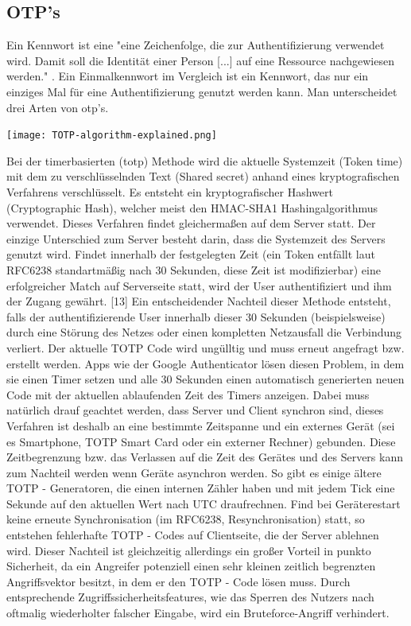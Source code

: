 \subsection{OTP's}
Ein Kennwort ist eine "eine Zeichenfolge, die zur Authentifizierung verwendet wird. Damit soll die Identität einer Person [...] auf eine Ressource nachgewiesen werden." \cite{A4}. Ein Einmalkennwort im Vergleich ist ein Kennwort, das nur ein einziges Mal für eine Authentifizierung genutzt werden kann. Man unterscheidet drei Arten von \ac{otp}'s.

\texttt{[image: TOTP-algorithm-explained.png]}

Bei der timerbasierten (\ac{totp}) Methode wird die aktuelle Systemzeit (Token time) mit dem zu verschlüsselnden Text (Shared secret) anhand eines kryptografischen Verfahrens verschlüsselt. Es entsteht ein kryptografischer Hashwert (Cryptographic Hash), welcher meist den HMAC-SHA1 Hashingalgorithmus verwendet. Dieses Verfahren findet gleichermaßen auf dem Server statt. Der einzige Unterschied zum Server besteht darin, dass die Systemzeit des Servers genutzt wird. Findet innerhalb der festgelegten Zeit (ein Token entfällt laut RFC6238 standartmäßig nach 30 Sekunden, diese Zeit ist modifizierbar) eine erfolgreicher Match auf Serverseite statt, wird der User authentifiziert und ihm der Zugang gewährt. [13] Ein entscheidender Nachteil dieser Methode entsteht, falls der authentifizierende User innerhalb dieser 30 Sekunden (beispielsweise) durch eine Störung des Netzes oder einen kompletten Netzausfall die Verbindung verliert. Der aktuelle TOTP Code wird ungülltig und muss erneut angefragt bzw. erstellt werden. Apps wie der Google Authenticator lösen diesen Problem, in dem sie einen Timer setzen und alle 30 Sekunden einen automatisch generierten neuen Code mit der aktuellen ablaufenden Zeit des Timers anzeigen. Dabei muss natürlich drauf geachtet werden, dass Server und Client synchron sind, dieses Verfahren ist deshalb an eine bestimmte Zeitspanne und ein externes Gerät (sei es Smartphone, TOTP Smart Card oder ein externer Rechner) gebunden. Diese Zeitbegrenzung bzw. das Verlassen auf die Zeit des Gerätes und des Servers kann zum Nachteil werden wenn Geräte asynchron werden. So gibt es einige ältere TOTP - Generatoren, die einen internen Zähler haben und mit jedem Tick eine Sekunde auf den aktuellen Wert nach UTC draufrechnen. Find bei Geräterestart keine erneute Synchronisation (im RFC6238, Resynchronisation) statt, so entstehen fehlerhafte TOTP - Codes auf Clientseite, die der Server ablehnen wird. Dieser Nachteil ist gleichzeitig allerdings ein großer Vorteil in punkto Sicherheit, da ein Angreifer potenziell einen sehr kleinen zeitlich begrenzten Angriffsvektor besitzt, in dem er den TOTP - Code lösen muss. Durch entsprechende Zugriffssicherheitsfeatures, wie das Sperren des Nutzers nach oftmalig wiederholter falscher Eingabe, wird ein Bruteforce-Angriff verhindert.

